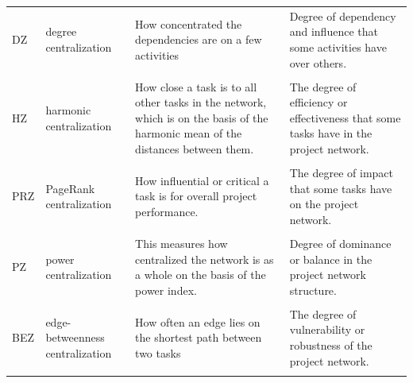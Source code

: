 \documentclass[preprint,
3p]{elsarticle} %
\begin{document}
\begin{appendices}
\begin{longtable}[t]{l>{\raggedright\arraybackslash}p{2.2cm}>{\raggedright\arraybackslash}p{3.8cm}>{\raggedright\arraybackslash}p{4.2cm}}
DZ & degree centralization & How concentrated the dependencies are on a few activities & Degree of dependency and influence that some activities have over others.\\
\cellcolor{gray!10}{CZ} & \cellcolor{gray!10}{closeness centralization} & \cellcolor{gray!10}{How close a task is to all other tasks in the network, on the basis of the sum of the shortest distances between them.} & \cellcolor{gray!10}{Degree of accessibility or reachability that some tasks have in the network.}\\
HZ & harmonic centralization & How close a task is to all other tasks in the network, which is on the basis of the harmonic mean of the distances between them. & The degree of efficiency or effectiveness that some tasks have in the project network.\\
\cellcolor{gray!10}{EZ} & \cellcolor{gray!10}{eigenvector centralization} & \cellcolor{gray!10}{How connected a task is to other well-connected tasks in the network, on the basis of the eigenvector of the adjacency matrix.} & \cellcolor{gray!10}{Degree of importance that some tasks have in the project network}\\
\addlinespace
PRZ & PageRank centralization & How influential or critical a task is for overall project performance. & The degree of impact that some tasks have on the project network.\\
\cellcolor{gray!10}{AZ} & \cellcolor{gray!10}{alpha centralization} & \cellcolor{gray!10}{This measures how centralized the network is as a whole, on the basis of the alpha index.} & \cellcolor{gray!10}{Degree of hierarchy or equality in the project network structure.}\\
PZ & power centralization & This measures how centralized the network is as a whole on the basis of the power index. & Degree of dominance or balance in the project network structure.\\
\cellcolor{gray!10}{BZ} & \cellcolor{gray!10}{betweenness centralization} & \cellcolor{gray!10}{How often a task lies on the shortest path between two other tasks.} & \cellcolor{gray!10}{Degree of intermediation that some tasks have in the project network.}\\
BEZ & edge-betweenness centralization & How often an edge lies on the shortest path between two tasks & The degree of vulnerability or robustness of the project network.\\
\addlinespace
\cellcolor{gray!10}{RRes} & \cellcolor{gray!10}{resilience for random attack} & \cellcolor{gray!10}{How well the network can maintain its connectivity when a fraction of tasks are randomly removed.} & \cellcolor{gray!10}{Degree of robustness or susceptibility of the network.}\\

\end{longtable}
\end{appendices}
\end{document}
